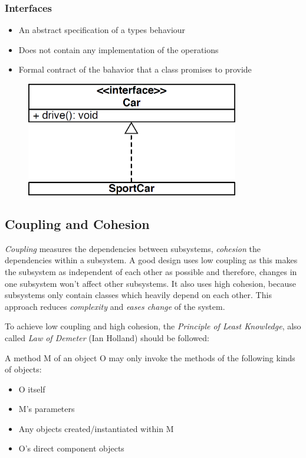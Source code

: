 \subsubsection*{Interfaces}
\begin{itemize}
	\item An abstract specification of a types behaviour
	\item Does not contain any implementation of the operations
	\item Formal contract of the bahavior that a class promises to provide
\end{itemize}
\begin{figure}[H]
	\centering
	\includegraphics[height=5cm,keepaspectratio]{images/oop_interface}
\end{figure}

\newpage

\subsection{Coupling and Cohesion}
\textit{Coupling} measures the dependencies between subsystems, \textit{cohesion} the dependencies within a subsystem.
A good design uses low coupling as this makes the subsystem as independent of each other as possible and therefore, changes in one subsystem won't affect other subsystems.
It also uses high cohesion, because subsystems only contain classes which heavily depend on each other.
This approach reduces \textit{complexity} and \textit{eases change} of the system.

To achieve low coupling and high cohesion, the \textit{Principle of Least Knowledge}, also called \textit{Law of Demeter} (Ian Holland) should be followed:

A method M of an object O may only invoke the methods of the following kinds of objects:
\begin{itemize}
	\item O itself
	\item M's parameters
	\item Any objects created/instantiated within M
	\item O's direct component objects
\end{itemize}

